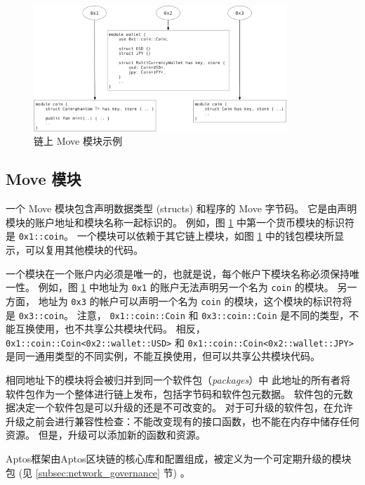 \documentclass{article}
\begin{document}
\begin{figure}
\centering
\includegraphics[width=0.85\textwidth]{move_1.pdf}
\caption{\label{fig:move_modules}链上 Move 模块示例}
\end{figure}

\subsection{Move 模块}

一个 Move 模块包含声明数据类型 (structs) 和程序的 Move 字节码。 它是由声明模块的账户地址和模块名称一起标识的。 例如，图 \ref{fig:move_modules} 中第一个货币模块的标识符是 \texttt{0x1::coin}。 一个模块可以依赖于其它链上模块，如图 \ref{fig:move_modules} 中的钱包模块所显示，可以复用其他模块的代码。

一个模块在一个账户内必须是唯一的，也就是说，每个帐户下模块名称必须保持唯一性。 例如，图 \ref{fig:move_modules} 中地址为 \texttt{0x1} 的账户无法声明另一个名为 \texttt{coin} 的模块。 另一方面， 地址为 \texttt{0x3} 的帐户可以声明一个名为 \texttt{coin} 的模块，这个模块的标识符将是 \texttt{0x3::coin}。 注意， \texttt{0x1::coin::Coin} 和 \texttt{0x3::coin::Coin} 是不同的类型，不能互换使用，也不共享公共模块代码。 相反，\texttt{0x1::coin::Coin<0x2::wallet::USD>} 和 \texttt{0x1::coin::Coin<0x2::wallet::JPY>} 是同一通用类型的不同实例，不能互换使用，但可以共享公共模块代码。

相同地址下的模块将会被归并到同一个软件包（\emph{packages}）中 此地址的所有者将软件包作为一个整体进行链上发布，包括字节码和软件包元数据。 软件包的元数据决定一个软件包是可以升级的还是不可改变的。 对于可升级的软件包，在允许升级之前会进行兼容性检查：不能改变现有的接口函数，也不能在内存中储存任何资源。 但是，升级可以添加新的函数和资源。

Aptos框架由Aptos区块链的核心库和配置组成，被定义为一个可定期升级的模块包 (见 \ref{subsec:network_governance} 节) 。
\end{document}

